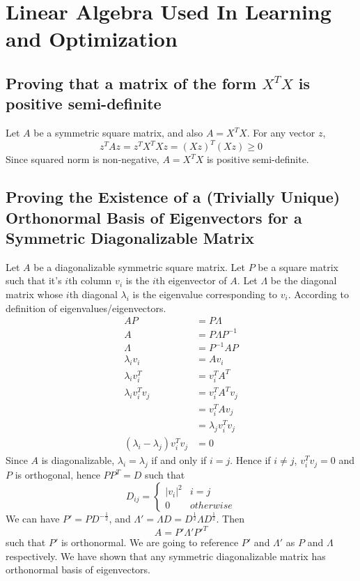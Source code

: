\documentclass{article}
\numberwithin{equation}{subsection}
\begin{document}
\section{Linear Algebra Used In Learning and Optimization}
\subsection{Proving that a matrix of the form $X^TX$ is positive semi-definite}
Let $A$ be a symmetric square matrix, and also $A=X^TX$. For any vector $z$, 
\begin{equation}
z^TAz = z^TX^TXz = (Xz)^T(Xz) \geq 0
\end{equation}
Since squared norm is non-negative, $A=X^TX$ is positive semi-definite.
\subsection{Proving the Existence of a (Trivially Unique) Orthonormal Basis of Eigenvectors for a Symmetric Diagonalizable Matrix}
Let $A$ be a diagonalizable symmetric square matrix. Let $P$ be a square matrix such that it's $i$th column $v_i$ is the $i$th eigenvector of $A$. Let $\Lambda$ be the diagonal matrix whose $i$th diagonal $\lambda_i$ is the eigenvalue corresponding to $v_i$. According to definition of eigenvalues/eigenvectors.
\begin{align}
    AP &= P\Lambda\\
    A &= P\Lambda P^{-1}\\
    \Lambda &= P^{-1}AP\\
    \lambda_iv_i &= Av_i\\
    \lambda_iv_i^T &= v_i^TA^T\\
    \lambda_iv_i^Tv_j &= v_i^TA^Tv_j\\
    &= v_i^TAv_j\\
    &= \lambda_jv_i^Tv_j\\
    (\lambda_i-\lambda_j)v_i^Tv_j &= 0
\end{align}
Since $A$ is diagonalizable, $\lambda_i=\lambda_j$ if and only if $i=j$. Hence if $i \neq j$, $v_i^Tv_j = 0$ and $P$ is orthogonal, hence 
$PP^T = D$ such that 
\begin{equation}
D_{ij} = \begin{cases}
    |v_i|^2 & i = j\\
    0 & otherwise
\end{cases}
\end{equation}
We can have $P' = PD^{-\frac{1}{2}}$, and $\Lambda' = \Lambda D = D^{\frac{1}{2}} \Lambda D^{\frac{1}{2}}$. Then
\begin{equation}
    A = P'\Lambda'P'^T 
\end{equation}
such that $P'$ is orthonormal. We are going to reference $P'$ and $\Lambda'$ as $P$ and $\Lambda$ respectively. We have shown that any symmetric diagonalizable matrix has orthonormal basis of eigenvectors.
\end{document}

